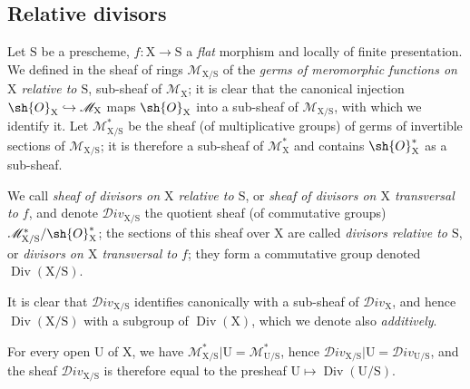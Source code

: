 \subsection{Relative divisors}
\label{subsection:IV.21.15}
\label{IV.21.15}

\begin{env}[21.15.1]
\label{IV.21.15.1}
Let $\mathrm{S}$ be a prescheme, $f:\mathrm{X}\to\mathrm{S}$ a \emph{flat} morphism and locally of finite presentation.
We defined in  the sheaf of rings $\mathscr{M}_{\mathrm{X}/\mathrm{S}}$ of the \emph{germs of meromorphic functions on $\mathrm{X}$ relative to $\mathrm{S}$}, sub-sheaf of $\mathscr{M}_{\mathrm{X}}$; it is clear that the canonical injection $\sh{O}_{\mathrm{X}}\hookrightarrow\mathscr{M}_{\mathrm{X}}$  maps $\sh{O}_{\mathrm{X}}$ into a sub-sheaf of $\mathscr{M}_{\mathrm{X}/\mathrm{S}}$, with which we identify it.
Let $\mathscr{M}_{\mathrm{X}/\mathrm{S}}^*$ be the sheaf (of multiplicative groups) of germs of invertible sections of $\mathscr{M}_{\mathrm{X}/\mathrm{S}}$; it is therefore a sub-sheaf of $\mathscr{M}_{\mathrm{X}}^*$ and contains $\sh{O}_{\mathrm{X}}^*$ as a sub-sheaf.
\end{env}

\begin{definition}[21.15.2]
\label{IV.21.15.2}
We call \emph{sheaf of divisors on $\mathrm{X}$ relative to $\mathrm{S}$}, or \emph{sheaf of divisors on $\mathrm{X}$ transversal to $f$}, and denote $\mathscr{D}iv_{\mathrm{X}/\mathrm{S}}$ the quotient sheaf (of commutative groups) $\mathscr{M}_{\mathrm{X}/\mathrm{S}}^*/\sh{O}_{\mathrm{X}}^*$; the sections of this sheaf over $\mathrm{X}$ are called \emph{divisors relative to $\mathrm{S}$}, or \emph{divisors on $\mathrm{X}$ transversal to $f$}; they form a commutative group denoted $\operatorname{Div}(\mathrm{X}/\mathrm{S})$.
\end{definition}

It is clear that $\mathscr{D}iv_{\mathrm{X}/\mathrm{S}}$ identifies canonically with a sub-sheaf of $\mathscr{D}iv_{\mathrm{X}}$, and hence $\operatorname{Div}(\mathrm{X}/\mathrm{S})$ with a subgroup of $\operatorname{Div}(\mathrm{X})$, which we denote also \emph{additively}.

For every open $\mathrm{U}$ of $\mathrm{X}$, we have $\mathscr{M}_{\mathrm{X}/\mathrm{S}}^*|\mathrm{U}=\mathscr{M}_{\mathrm{U}/\mathrm{S}}^*$, hence $\mathscr{D}iv_{\mathrm{X}/\mathrm{S}}|\mathrm{U}=\mathscr{D}iv_{\mathrm{U}/\mathrm{S}}$, and the sheaf $\mathscr{D}iv_{\mathrm{X}/\mathrm{S}}$ is therefore equal to the presheaf $\mathrm{U}\mapsto\operatorname{Div}(\mathrm{U}/\mathrm{S})$.

